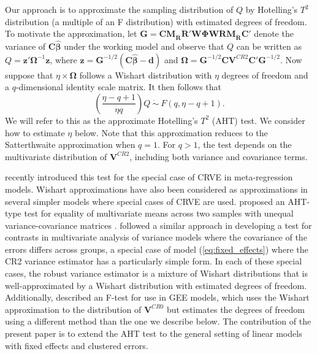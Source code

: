\documentclass[12pt]{article}\usepackage[]{graphicx}\usepackage[]{color}
\newcommand{\bm}{\mathbf}
\newcommand{\bs}{\boldsymbol}
\begin{document}
Our approach is to approximate the sampling distribution of $Q$ by Hotelling's $T^2$ distribution (a multiple of an F distribution) with estimated degrees of freedom. To motivate the approximation, let $\bm{G} = \bm{C} \bm{M_{\ddot{R}}}\bm{\ddot{R}}'\bm{W}\bs\Phi\bm{W}\bm{\ddot{R}}\bm{M_{\ddot{R}}} \bm{C}'$ denote the variance of $\bm{C}\bs{\hat\beta}$ under the working model and observe that $Q$ can be written as $Q = \bm{z}' \bs\Omega^{-1} \bm{z}$, where $\bm{z} = \bm{G}^{-1/2}\left(\bm{C}\bs{\hat\beta} - \bm{d}\right)$ and $\bs\Omega = \bm{G}^{-1/2} \bm{C} \bm{V}^{CR2}\bm{C}'\bm{G}^{-1/2}$. 
Now suppose that $\eta \times \bs\Omega$ follows a Wishart distribution with $\eta$ degrees of freedom and a $q$-dimensional identity scale matrix. It then follows that
\begin{equation}
\label{eq:AHT}
\left(\frac{\eta - q + 1}{\eta q}\right) Q \ \dot\sim \ F(q, \eta - q + 1).
\end{equation}
We will refer to this as the approximate Hotelling's $T^2$ (AHT) test.
We consider how to estimate $\eta$ below.
Note that this approximation reduces to the Satterthwaite approximation when $q = 1$. 
For $q > 1$, the test depends on the multivariate distribution of $\bm{V}^{CR2}$, including both variance and covariance terms. 

 recently introduced this test for the special case of CRVE in meta-regression models.
Wishart approximations have also been considered as approximations in several simpler models where special cases of CRVE are used.
\citet{Nel1986solution} proposed an AHT-type test for equality of multivariate means across two samples with unequal variance-covariance matrices \citep[i.e., the multivariate Behrens-Fisher problem; see also][]{Krishnamoorthy2004modified}.
\citet{Zhang2012twowayANOVA} followed a similar approach in developing a test for contrasts in multivariate analysis of variance models where the covariance of the errors differs across groups, a special case of model (\ref{eq:fixed_effects}) where the CR2 variance estimator has a particularly simple form. 
In each of these special cases, the robust variance estimator is a mixture of Wishart distributions that is well-approximated by a Wishart distribution with estimated degrees of freedom.
Additionally, \citet{Pan2002small} described an F-test for use in GEE models, which uses the Wishart approximation to the distribution of $\bm{V}^{CR0}$ but estimates the degrees of freedom using a different method than the one we describe below.
The contribution of the present paper is to extend the AHT test to the general setting of linear models with fixed effects and clustered errors. 
\end{document}
